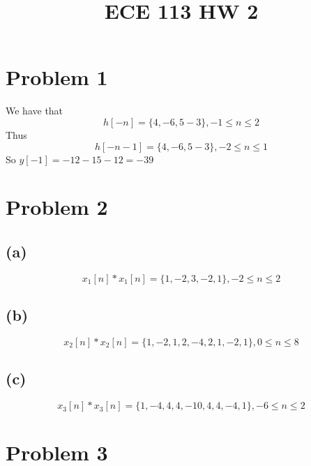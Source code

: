 
\title{ECE 113 HW 2}

\maketitle
\section*{Problem 1}
We have that 
$$h[-n]=\{4,-6,5-3\},-1\leq n \leq 2$$
Thus 
$$h[-n-1]=\{4,-6,5-3\},-2\leq n \leq 1$$
So $y[-1]=-12-15-12=\boxed{-39}$
\section*{Problem 2}
\subsection*{(a)}
$$x_1[n]*x_1[n]=\boxed{\{1,-2,3,-2,1\},-2\leq n \leq 2}$$
\subsection*{(b)}
$$x_2[n]*x_2[n]=\boxed{\{1,-2,1,2,-4,2,1,-2,1\},0\leq n \leq 8}$$
\subsection*{(c)}
$$x_3[n]*x_3[n]=\boxed{\{1, -4, 4, 4, -10, 4, 4, -4, 1\},-6\leq n \leq 2}$$
\section*{Problem 3}

